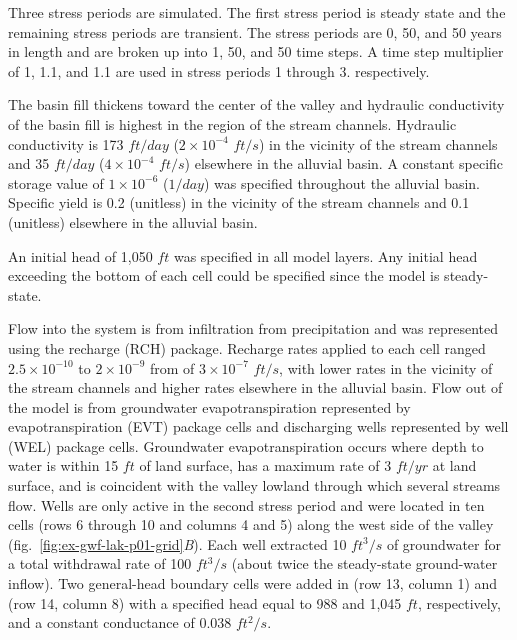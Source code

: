 Three stress periods are simulated. The first stress period is steady state and the remaining stress periods are transient. The stress periods are 0, 50, and 50 years in length and are broken up into 1, 50, and 50 time steps. A time step multiplier of 1, 1.1, and 1.1 are used in stress periods 1 through 3. respectively.



The basin fill thickens toward the center of the valley and hydraulic conductivity of the basin fill is highest in the region of the stream channels. Hydraulic conductivity is 173 $ft/day$ ($2 \times 10^{-4}$ $ft/s$) in the vicinity of the stream channels and 35 $ft/day$ ($4 \times 10^{-4}$ $ft/s$) elsewhere in the alluvial basin. A constant specific storage value of $1 \times 10^{-6}$ ($1/day$) was specified throughout the alluvial basin. Specific yield is 0.2 (unitless) in the vicinity of the stream channels and 0.1 (unitless) elsewhere in the alluvial basin.

An initial head of 1,050 $ft$ was specified in all model layers. Any initial head exceeding the bottom of each cell could be specified since the model is steady-state.

Flow into the system is from infiltration from precipitation and was represented using the recharge (RCH) package. Recharge rates applied to each cell ranged $2.5 \times 10^{-10}$ to $2 \times 10^{-9}$ from  of $3 \times 10^{-7}$ $ft/s$, with lower rates in the vicinity of the stream channels and higher rates elsewhere in the alluvial basin. Flow out of the model is from groundwater evapotranspiration represented by evapotranspiration (EVT) package cells and discharging wells represented by well (WEL) package cells. Groundwater evapotranspiration occurs where depth to water is within 15 $ft$ of land surface, has a maximum rate of 3 $ft/yr$ at land surface, and is coincident with the valley lowland through which several streams flow. Wells are only active in the second stress period and were located in ten cells (rows 6 through 10 and columns 4 and 5) along the west side of the valley (fig.~\ref{fig:ex-gwf-lak-p01-grid}\textit{B}). Each well extracted 10 $ft^{3}/s$ of groundwater for a total withdrawal rate of 100 $ft^{3}/s$ (about twice the steady-state ground-water inflow). Two general-head boundary cells were added in (row 13, column 1) and (row 14, column 8) with a specified head equal to 988 and 1,045 $ft$, respectively, and a constant conductance of 0.038 $ft^{2}/s$.

